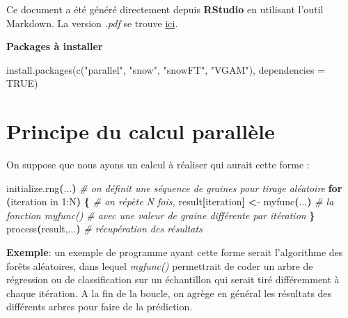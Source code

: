 \documentclass[
]{book}
\newenvironment{Shaded}{\begin{snugshade}}{\end{snugshade}}
\newcommand{\AttributeTok}[1]{\textcolor[rgb]{0.77,0.63,0.00}{#1}}
\newcommand{\CommentTok}[1]{\textcolor[rgb]{0.56,0.35,0.01}{\textit{#1}}}
\newcommand{\ConstantTok}[1]{\textcolor[rgb]{0.00,0.00,0.00}{#1}}
\newcommand{\ControlFlowTok}[1]{\textcolor[rgb]{0.13,0.29,0.53}{\textbf{#1}}}
\newcommand{\ErrorTok}[1]{\textcolor[rgb]{0.64,0.00,0.00}{\textbf{#1}}}
\newcommand{\ExtensionTok}[1]{#1}
\newcommand{\FunctionTok}[1]{\textcolor[rgb]{0.00,0.00,0.00}{#1}}
\newcommand{\KeywordTok}[1]{\textcolor[rgb]{0.13,0.29,0.53}{\textbf{#1}}}
\newcommand{\NormalTok}[1]{#1}
\newcommand{\OperatorTok}[1]{\textcolor[rgb]{0.81,0.36,0.00}{\textbf{#1}}}
\newcommand{\StringTok}[1]{\textcolor[rgb]{0.31,0.60,0.02}{#1}}
\newcommand{\VariableTok}[1]{\textcolor[rgb]{0.00,0.00,0.00}{#1}}
\theoremstyle{definition}
\theoremstyle{definition}
\theoremstyle{definition}
\theoremstyle{definition}
\theoremstyle{remark}
\begin{document}
Ce document a été généré directement depuis \textbf{RStudio} en utilisant l'outil Markdown. La version \emph{.pdf} se trouve \href{chapitre_3_avance.pdf}{ici}.

\textbf{Packages à installer}

\begin{Shaded}
\begin{Highlighting}[]
\FunctionTok{install.packages}\NormalTok{(}\FunctionTok{c}\NormalTok{(}\StringTok{"parallel"}\NormalTok{, }\StringTok{"snow"}\NormalTok{, }\StringTok{"snowFT"}\NormalTok{, }\StringTok{"VGAM"}\NormalTok{), }
                 \AttributeTok{dependencies =} \ConstantTok{TRUE}\NormalTok{)}
\end{Highlighting}
\end{Shaded}

\hypertarget{principe-du-calcul-paralluxe8le}{%
\section{Principe du calcul parallèle}\label{principe-du-calcul-paralluxe8le}}

On suppose que nous ayons un calcul à réaliser qui aurait cette forme :

\begin{Shaded}
\begin{Highlighting}[]
\ExtensionTok{initialize.rng}\ErrorTok{(}\ExtensionTok{...}\KeywordTok{)} \CommentTok{\# on définit une séquence de graines pour tirage aléatoire}
\ControlFlowTok{for} \KeywordTok{(}\ExtensionTok{iteration}\NormalTok{ in 1:N}\KeywordTok{)} \KeywordTok{\{}              \CommentTok{\# on répète N fois,  }
    \VariableTok{result}\OperatorTok{[}\NormalTok{iteration}\OperatorTok{]} \OperatorTok{\textless{}}\NormalTok{{-} }\ExtensionTok{myfunc}\ErrorTok{(}\ExtensionTok{...}\KeywordTok{)}  \CommentTok{\# la fonction myfunc() }
                                      \CommentTok{\# avec une valeur de graine différente par itération}
\KeywordTok{\}}
\ExtensionTok{process}\ErrorTok{(}\ExtensionTok{result,...}\KeywordTok{)} \CommentTok{\# récupération des résultats }
\end{Highlighting}
\end{Shaded}

\textbf{Exemple}: un exemple de programme ayant cette forme serait l'algorithme des forêts aléatoires, dans lequel \emph{myfunc()} permettrait de coder un arbre de régression ou de classification sur un échantillon qui serait tiré différemment à chaque itération. A la fin de la boucle, on agrège en général les résultats des différents arbres pour faire de la prédiction.
\end{document}
